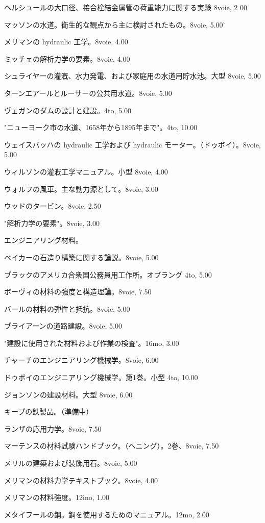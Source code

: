 \documentclass[a4paper,11pt,openany]{ltjsbook}
\begin{document}
ヘルシュールの大口径、接合栓結金属管の荷重能力に関する実験 8voie, 2 00

マッソンの水道。衛生的な観点から主に検討されたもの。8voie, 5.00'

メリマンの hydraulic 工学。8voie, 4.00

ミッチェの解析力学の要素。8voie, 4.00

シュライヤーの灌漑、水力発電、および家庭用の水道用貯水池。大型 8voie, 5.00

ターンエアールとルーサーの公共用水道。8voie, 5.00

ヴェガンのダムの設計と建設。4to, 5.00

"ニューヨーク市の水道、1658年から1895年まで"。4to, 10.00

ウェイスバッハの hydraulic 工学および hydraulic モーター。（ドゥボイ）。8voie, 5.00

ウィルソンの灌漑工学マニュアル。小型 8voie, 4.00

ウォルフの風車。主な動力源として。8voie, 3.00

ウッドのタービン。8voie, 2.50

"解析力学の要素"。8voie, 3.00

エンジニアリング材料。

ベイカーの石造り構築に関する論説。8voie, 5.00

ブラックのアメリカ合衆国公務員用工作所。オブラング 4to, 5.00

ボーヴィの材料の強度と構造理論。8voie, 7.50

バールの材料の弾性と抵抗。8voie, 5.00

ブライアーンの道路建設。8voie, 5.00

"建設に使用された材料および作業の検査"。16mo, 3.00

チャーチのエンジニアリング機械学。8voie, 6.00

ドゥボイのエンジニアリング機械学。第1巻。小型 4to, 10.00

ジョンソンの建設材料。大型 8voie, 6.00

キープの鉄製品。（準備中）

ランザの応用力学。8voie, 7.50

マーテンスの材料試験ハンドブック。（ヘニング）。2巻、8voie, 7.50

メリルの建築および装飾用石。8voie, 5.00

メリマンの材料力学テキストブック。8voie, 4.00

メリマンの材料強度。12ino, 1.00

メタイフールの鋼。鋼を使用するためのマニュアル。12mo, 2.00
\end{document}
